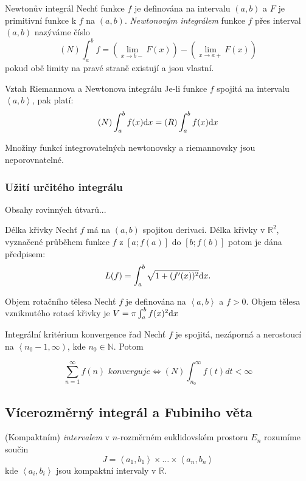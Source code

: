 \begin{definiceN}{Newtonův integrál}
Nechť funkce $f$ je definována na intervalu $(a,b)$ a $F$ je primitivní funkce k $f$ na $(a,b)$. \emph{Newtonovým integrálem} funkce $f$ přes interval $(a,b)$ nazýváme číslo
$$(N)\int_a^bf = (\lim_{x\rightarrow b-}F(x))-(\lim_{x\rightarrow a+}F(x))$$
pokud obě limity na pravé straně existují a jsou vlastní.
\end{definiceN}

\begin{poznamkaN}{Vztah Riemannova a Newtonova integrálu}
Je-li funkce $f$ spojitá na intervalu $\left<a,b\right>$, pak platí: 
$$(N)\int_a^b f(x) \mathrm{d} x = (R)\int_a^b f(x) \mathrm{d} x$$

Množiny funkcí integrovatelných newtonovsky a riemannovsky jsou neporovnatelné.
\end{poznamkaN}


\subsubsection{Užití určitého integrálu}

Obsahy rovinných útvarů...

\begin{vetaN}{Délka křivky}
Nechť $f$ má na $(a,b)$ spojitou derivaci. Délka křivky v $\mathbb{R}^2$, vyznačené průběhem funkce $f$ z $[a;f(a)]$ do $[b;f(b)]$ potom je dána předpisem:
$$L(f)=\int_a^b \sqrt{1+(f'(x))^2}\mathrm{d} x.$$
\end{vetaN}

\begin{vetaN}{Objem rotačního tělesa}
Nechť $f$ je definována na $\left<a,b\right>$ a $f>0$. Objem tělesa vzniknutého rotací křivky je $V=\pi \int_a^bf(x)^2\mathrm{d} x$
\end{vetaN}

\begin{vetaN}{Integrální kritérium konvergence řad}
Nechť $f$ je spojitá, nezáporná a nerostoucí na $\left<n_0-1,\infty\right)$, kde $n_0 \in \mathbb{N}$. Potom

$$\sum_{n=1}^{\infty} f(n) \textit{ konverguje} \Leftrightarrow (N)\int_{n_0}^{\infty}f(t)dt < \infty$$
\end{vetaN}

\subsection{Vícerozměrný integrál a Fubiniho věta}

\begin{definice}
(Kompaktním) \emph{intervalem} v $n$-rozměrném euklidovském prostoru $E_n$ rozumíme součin
$$J = \left<a_1,b_1\right> \times \dots \times \left<a_n,b_n\right>$$
kde $\left<a_i,b_i\right>$ jsou kompaktní intervaly v $\mathbb{R}$.
\end{definice}

